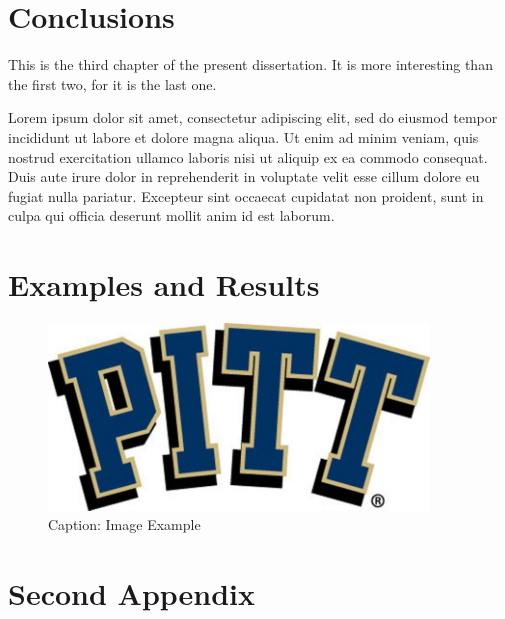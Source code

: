 \documentclass[hidelinks,pdftex,phd]{pittetd}
\begin{document}
\chapter{Conclusions}
This is the third chapter of the present dissertation.\cite{DUMMY:6} It is more interesting than the first two, for it is the last one.\cite{DUMMY:7}

Lorem ipsum dolor sit amet, consectetur adipiscing elit, sed do eiusmod tempor incididunt ut labore et dolore magna aliqua.\cite{DUMMY:8} Ut enim ad minim veniam, quis nostrud exercitation ullamco laboris nisi ut aliquip ex ea commodo consequat.\cite{DUMMY:9} Duis aute irure dolor in reprehenderit in voluptate velit esse cillum dolore eu fugiat nulla pariatur.\cite{DUMMY:10} Excepteur sint occaecat cupidatat non proident, sunt in culpa qui officia deserunt mollit anim id est laborum.



\appendix     
\chapter{Examples and Results}
\begin{figure}[t]
    \centering
    \includegraphics[width=0.9\textwidth]{Images/Picture-Example.jpg}
    \caption{Caption: Image Example}
    
    \label{Reference: Picture Example}
\end{figure}

\chapter{Second Appendix}




\end{document}
